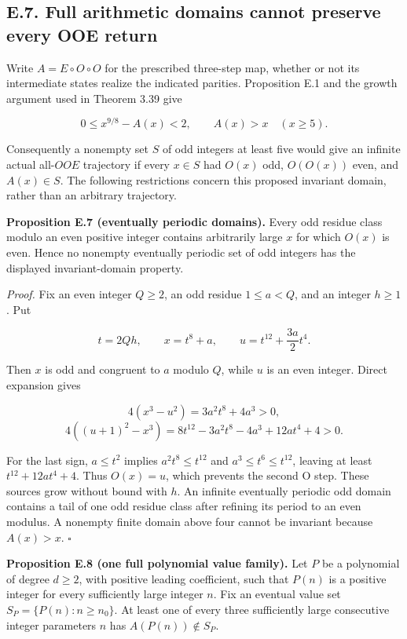 \documentclass[12pt]{article}
\begin{document}
\subsection{E.7. Full arithmetic domains cannot preserve every OOE
return}\label{e.7.-full-arithmetic-domains-cannot-preserve-every-ooe-return}

Write \(A=E\circ O\circ O\) for the prescribed three-step map, whether
or not its intermediate states realize the indicated parities.
Proposition E.1 and the growth argument used in Theorem 3.39 give

\[
0\le x^{9/8}-A(x)<2,\qquad A(x)>x\quad(x\ge5).
\tag{E7a}
\]

Consequently a nonempty set \(S\) of odd integers at least five would
give an infinite actual all-\(OOE\) trajectory if every \(x\in S\) had
\(O(x)\) odd, \(O(O(x))\) even, and \(A(x)\in S\). The following
restrictions concern this proposed invariant domain, rather than an
arbitrary trajectory.

\textbf{Proposition E.7 (eventually periodic domains).} Every odd
residue class modulo an even positive integer contains arbitrarily large
\(x\) for which \(O(x)\) is even. Hence no nonempty eventually periodic
set of odd integers has the displayed invariant-domain property.

\emph{Proof.} Fix an even integer \(Q\ge2\), an odd residue
\(1\le a<Q\), and an integer \(h\ge1\). Put

\[
t=2Qh,\qquad x=t^8+a,\qquad
u=t^{12}+\frac{3a}{2}t^4.
\]

Then \(x\) is odd and congruent to \(a\) modulo \(Q\), while \(u\) is an
even integer. Direct expansion gives

\[
4(x^3-u^2)=3a^2t^8+4a^3>0,
\] \[
4((u+1)^2-x^3)
=8t^{12}-3a^2t^8-4a^3+12at^4+4>0.
\]

For the last sign, \(a\le t^2\) implies \(a^2t^8\le t^{12}\) and
\(a^3\le t^6\le t^{12}\), leaving at least \(t^{12}+12at^4+4\). Thus
\(O(x)=u\), which prevents the second O step. These sources grow without
bound with \(h\). An infinite eventually periodic odd domain contains a
tail of one odd residue class after refining its period to an even
modulus. A nonempty finite domain above four cannot be invariant because
\(A(x)>x\). \(\square\)

\textbf{Proposition E.8 (one full polynomial value family).} Let \(P\)
be a polynomial of degree \(d\ge2\), with positive leading coefficient,
such that \(P(n)\) is a positive integer for every sufficiently large
integer \(n\). Fix an eventual value set \(S_P=\{P(n):n\ge n_0\}\). At
least one of every three sufficiently large consecutive integer
parameters \(n\) has \(A(P(n))\notin S_P\).
\end{document}
